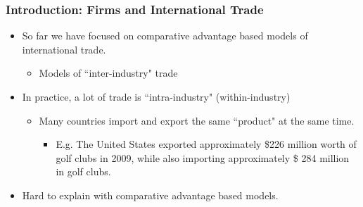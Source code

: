 \documentclass{beamer}
\begin{document}
\begin{frame}
	\frametitle{Introduction: Firms and International Trade}

\begin{itemize}
	\item So far we have focused on comparative advantage based models of international trade.
		\begin{itemize}
			\item Models of ``inter-industry" trade
		\end{itemize}
	\item In practice, a lot of trade is ``intra-industry" (within-industry)
		\begin{itemize}
			\item Many countries import and export the same ``product" at the same time.
				\begin{itemize}
					\item E.g. The United States exported approximately \$226 million worth of golf clubs in 2009, while also importing approximately \$ 284 million in golf clubs.
				\end{itemize}
		\end{itemize}
	\item Hard to explain with comparative advantage based models.
\end{itemize}
\end{frame}
\end{document}
